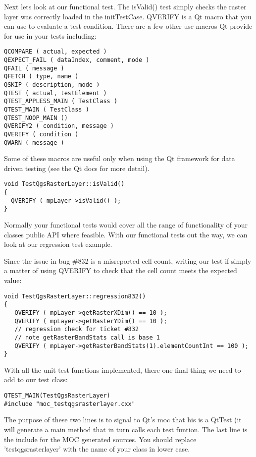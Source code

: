Next lets look at our functional test. The isValid() test simply checks the
raster layer was correctly loaded in the initTestCase.  QVERIFY is a Qt macro
that you can use to evaluate a test condition.  There are a few other use
macros Qt provide for use in your tests including:

\begin{verbatim}
QCOMPARE ( actual, expected )
QEXPECT_FAIL ( dataIndex, comment, mode )
QFAIL ( message )
QFETCH ( type, name )
QSKIP ( description, mode )
QTEST ( actual, testElement )
QTEST_APPLESS_MAIN ( TestClass )
QTEST_MAIN ( TestClass )
QTEST_NOOP_MAIN ()
QVERIFY2 ( condition, message )
QVERIFY ( condition )
QWARN ( message ) 
\end{verbatim}

Some of these macros are useful only when using the Qt framework for data
driven testing (see the Qt docs for more detail).

\begin{verbatim}
void TestQgsRasterLayer::isValid()
{
  QVERIFY ( mpLayer->isValid() );
}
\end{verbatim}

Normally your functional tests would cover all the range of functionality of
your classes public API where feasible. With our functional tests out the way,
we can look at our regression test example.

Since the issue in bug \#832 is a misreported cell count, writing our test if
simply a matter of using QVERIFY to check that the cell count meets the
expected value:

\begin{verbatim}
void TestQgsRasterLayer::regression832()
{
   QVERIFY ( mpLayer->getRasterXDim() == 10 );
   QVERIFY ( mpLayer->getRasterYDim() == 10 );
   // regression check for ticket #832
   // note getRasterBandStats call is base 1
   QVERIFY ( mpLayer->getRasterBandStats(1).elementCountInt == 100 );
}
\end{verbatim}

With all the unit test functions implemented, there one final thing we need to
add to our test class:

\begin{verbatim}
QTEST_MAIN(TestQgsRasterLayer)
#include "moc_testqgsrasterlayer.cxx"
\end{verbatim}

The purpose of these two lines is to signal to Qt's moc that his is a QtTest
(it will generate a main method that in turn calls each test funtion.  The last
line is the include for the MOC generated sources. You should replace
'testqgsrasterlayer' with the name of your class in lower case.

